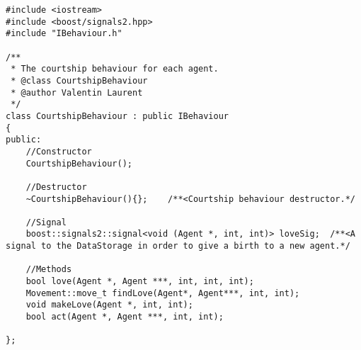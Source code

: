 \begin{lstlisting}[style=c++]
#include <iostream>
#include <boost/signals2.hpp>
#include "IBehaviour.h"

/**
 * The courtship behaviour for each agent.
 * @class CourtshipBehaviour
 * @author Valentin Laurent
 */
class CourtshipBehaviour : public IBehaviour
{
public:
    //Constructor
    CourtshipBehaviour();
    
    //Destructor
    ~CourtshipBehaviour(){};    /**<Courtship behaviour destructor.*/
    
    //Signal
    boost::signals2::signal<void (Agent *, int, int)> loveSig;  /**<A signal to the DataStorage in order to give a birth to a new agent.*/
    
    //Methods
    bool love(Agent *, Agent ***, int, int, int);
    Movement::move_t findLove(Agent*, Agent***, int, int);
    void makeLove(Agent *, int, int);
    bool act(Agent *, Agent ***, int, int);
    
};
\end{lstlisting}